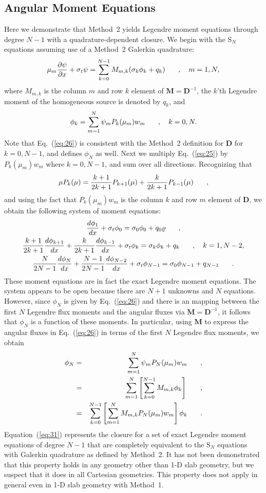 \documentclass[12pt]{article}
\newcommand{\bracket}[1]{\left[ #1 \right]}
\newcommand{\dxdy}[2]{\frac{\partial #1}{\partial #2}}
\newcommand{\dddx}[1]{\frac{d #1}{d x}}
\newcommand{\bea}{\begin{eqnarray}}
\newcommand{\eea}{\end{eqnarray}}
\newcommand{\be}{\begin{equation}}
\newcommand{\ee}{\end{equation}}
\newcommand{\pec}{\hspace{0.25in},}
\newcommand{\pep}{\hspace{0.25in}.}
\newcommand{\LEQ}[1]{\label{eq:#1}}
\newcommand{\EQ}[1]{Eq.~(\ref{eq:#1})}
\newcommand{\REQ}[1]{\ref{eq:#1}}
\newcommand{\mD}{\mathbf{D}}
\newcommand{\mM}{\mathbf{M}}
\begin{document}
\begin{center}
\subsection{Angular Moment Equations}
\label{sec:momeqns}
Here we demonstrate that Method~2 yields Legendre moment equations through degree $N-1$ with a quadrature-dependent closure.  We begin with the 
S$_N$ equations assuming use of a Method~2 Galerkin quadrature:
\be
\mu_m \dxdy{\psi}{x} + \sigma_t \psi = \sum_{k=0}^{N-1} M_{m,k} (\sigma_k \phi_k + q_k)  \pec \quad m=1,N,
\LEQ{25}
\ee
where $M_{m,k}$ is the column $m$ and row $k$ element of $\mM=\mD^{-1}$, the $k$'th Legendre moment of the homogeneous 
source is denoted by $q_k$, and 
\be
\phi_k = \sum_{m=1}^{N} \psi_m P_k(\mu_m) w_m \pec \quad k=0,N.
\LEQ{26}
\ee
Note that \EQ{26} is consistent with the Method~2 definition for $\mD$ for $k=0,N-1$, and defines $\phi_N$ as well.
Next we multiply \EQ{25} by $P_k(\mu_m) w_m$ where $k=0,N-1$, and sum over all directions. Recognizing that 
\be
\mu P_k(\mu) = \frac{k+1}{2k+1} P_{k+1}(\mu) + \frac{k}{2k+1} P_{k-1}(\mu) \pec
\LEQ{27}
\ee
and using the fact that $P_k(\mu_m) w_m$ is the column $k$ and row $m$ element of $\mD$, 
we obtain the following system of moment equations:
\begin{gather}
\LEQ{28}
\dddx{\phi_1} + \sigma_t \phi_0 = \sigma_0 \phi_0 + q_0 \varrho \pec \\
\LEQ{29}
\frac{k+1}{2k+1} \dddx{\phi_{k+1}} + \frac{k}{2k+1} \dddx{\phi_{k-1}} +  \sigma_t \phi_k  = \sigma_k \phi_k + q_k \pec \quad k=1,N-2, \\
\LEQ{30}
\frac{N}{2N-1} \dddx{\phi_{N}} + \frac{N-1}{2N-1} \dddx{\phi_{N-2}} + \sigma_t \phi_{N-1} = \sigma_0 \phi_{N-1} + q_{N-1} \pep
\end{gather}
These moment equations are in fact the exact Legendre moment equations.  The system appears to be open because there are 
$N+1$ unknowns and $N$ equations. However, since $\phi_{N}$ is given by \EQ{26} and there is an mapping between the first $N$ Legendre flux moments and the angular fluxes via $\mM=\mD^{-1}$, it follows that $\phi_N$ is a function of these moments.  In particular, using $\mM$ to express the angular fluxes in \EQ{26} in terms of the first $N$ Legendre flux moments, we obtain 
\bea
\phi_N &=& \sum_{m=1}^{N} \psi_m P_N(\mu_m) w_m  \pec \nonumber \\
 & = & \sum_{m=1}^{N} \bracket{ \sum_{k=0}^{N-1} M_{m,k} \phi_k}  \pec \nonumber \\
 & = & \sum_{k=0}^{N-1}\bracket{ \sum_{m=1}^{N} M_{m,k} P_N(\mu_m) w_m} \phi_k \pep
\LEQ{31}
\eea
Equation~(\REQ{31}) represents the closure for a set of exact Legendre moment equations of degree $N-1$ that are completely equivalent to the 
S$_N$ equations with Galerkin quadrature as defined by Method~2.  It has not been demonstrated that this property holds in any geometry other 
than 1-D slab geometry, but we suspect that it does in all Cartesian geometries.  This property does not apply in general even in 1-D slab geometry 
with Method~1. 



\end{center}
\end{document}

